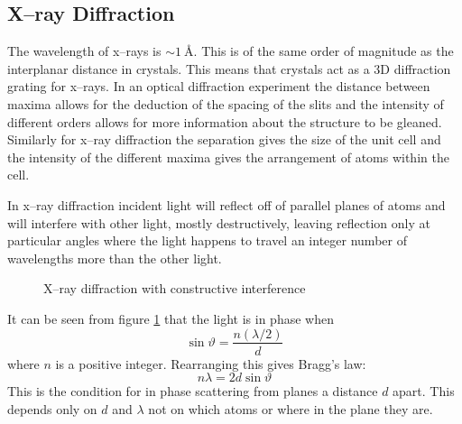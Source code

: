     \subsection{X--ray Diffraction}
    The wavelength of x--rays is \(\sim\SI{1}{\angstrom}\).
    This is of the same order of magnitude as the interplanar distance in crystals.
    This means that crystals act as a 3D diffraction grating for x--rays.
    In an optical diffraction experiment the distance between maxima allows for the deduction of the spacing of the slits and the intensity of different orders allows for more information about the structure to be gleaned.
    Similarly for x--ray diffraction the separation gives the size of the unit cell and the intensity of the different maxima gives the arrangement of atoms within the cell.
    
    In x--ray diffraction incident light will reflect off of parallel planes of atoms and will interfere with other light, mostly destructively, leaving reflection only at particular angles where the light happens to travel an integer number of wavelengths more than the other light.
    \begin{figure}[ht]
        \centering
        \caption{X--ray diffraction with constructive interference}
        \label{fig:x-ray diffraction}
    \end{figure}
    It can be seen from figure \ref{fig:x-ray diffraction} that the light is in phase when
    \[\sin\vartheta = \frac{n(\lambda/2)}{d}\]
    where \(n\) is a positive integer.
    Rearranging this gives Bragg's law:
    \begin{equation}\label{eqn:Bragg's law}
        n\lambda = 2d\sin\vartheta
    \end{equation}
    This is the condition for in phase scattering from planes a distance \(d\) apart.
    This depends only on \(d\) and \(\lambda\) not on which atoms or where in the plane they are.
    
